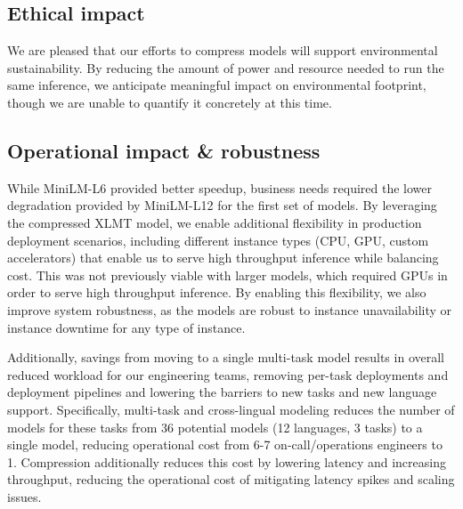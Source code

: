\subsection{Ethical impact}
We are pleased that our efforts to compress models will support environmental sustainability.
By reducing the amount of power and resource needed to run the same inference, we anticipate meaningful impact on environmental footprint, though we are unable to quantify it concretely at this time.

\subsection{Operational impact \& robustness}
While MiniLM-L6 provided better speedup, business needs required the lower degradation provided by MiniLM-L12 for the first set of models.
By leveraging the compressed XLMT model, we enable additional flexibility in production deployment scenarios, including different instance types (CPU, GPU, custom accelerators) that enable us to serve high throughput inference while balancing cost.
This was not previously viable with larger models, which required GPUs in order to serve high throughput inference.
By enabling this flexibility, we also improve system robustness, as the models are robust to instance unavailability or instance downtime for any type of instance.

Additionally, savings from moving to a single multi-task model results in overall reduced workload for our engineering teams, removing per-task deployments and deployment pipelines and lowering the barriers to new tasks and new language support.
Specifically, multi-task and cross-lingual modeling reduces the number of models for these tasks from 36 potential models (12 languages, 3 tasks) to a single model, reducing operational cost from 6-7 on-call/operations engineers to 1.
Compression additionally reduces this cost by lowering latency and increasing throughput, reducing the operational cost of mitigating latency spikes and scaling issues.

